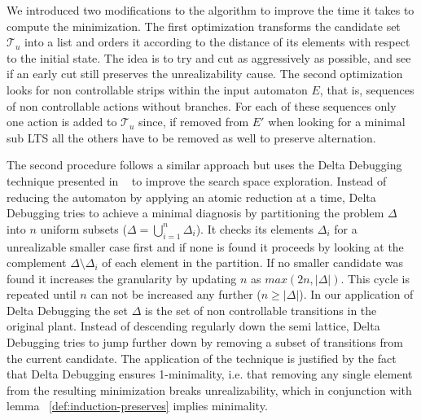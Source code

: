 We introduced two modifications to the algorithm
to improve the time it takes to compute the minimization.
The first optimization transforms the candidate set $\mathcal{T}_u$
into a list and orders it according to the distance of its elements 
with respect to the initial state.  The idea is to try and cut
as aggressively as possible, and see if an early cut still
preserves the unrealizability cause.  The second optimization
looks for non controllable strips within the  input automaton
$E$, that is, sequences of non controllable actions without branches.
For each of these sequences only one action is
added to $\mathcal{T}_u$ since, if removed from $E'$
when looking for a minimal sub LTS all the others have to be removed
as well to preserve alternation.

The second procedure follows a similar approach but uses the Delta Debugging technique presented in ~\cite{DBLP:journals/tse/ZellerH02} to improve the search space exploration. Instead of reducing the automaton by applying an atomic reduction at a time, Delta Debugging tries to achieve a minimal diagnosis by partitioning the problem $\Delta$ into $n$ uniform subsets ($\Delta = \bigcup_{i=1}^n \Delta_i $). It checks its elements $\Delta_i$ for a unrealizable smaller case first and if none is found it proceeds by looking at the complement $\Delta \setminus \Delta_i$ of each element in the partition. If no smaller candidate was found it increases the granularity by updating $n$ as $max(2n,|\Delta|)$. This cycle is repeated until $n$ can not be increased any further ($n \geq |\Delta|$). 
In our application of Delta Debugging the set $\Delta$ is the set of non controllable transitions in the original plant. Instead of descending regularly down the semi lattice, Delta Debugging tries to jump further down by removing a subset of transitions from the current candidate. The application of the technique is justified by the fact that Delta Debugging ensures 1-minimality, i.e. that removing any single element from the resulting minimization breaks unrealizability, which in conjunction with lemma ~\ref{def:induction-preserves} implies minimality.
